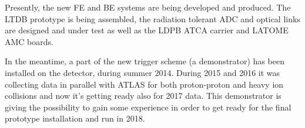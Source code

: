 \documentclass{llncs}
\begin{document}
Presently, the new FE and BE systems are being developed and produced. The LTDB prototype is being assembled, the radiation tolerant ADC and optical links are designed and under test as well as the LDPB ATCA carrier and LATOME AMC boards. 

In the meantime, a part of the new trigger scheme (a demonstrator) has been installed on the detector, during summer 2014. During 2015 and 2016 it was collecting data in parallel with ATLAS for both proton-proton and heavy ion collisions and now it's getting ready also for 2017 data. This demonstrator is giving the possibility to gain some experience in order to get ready for the final prototype installation and run in 2018.



\end{document}

